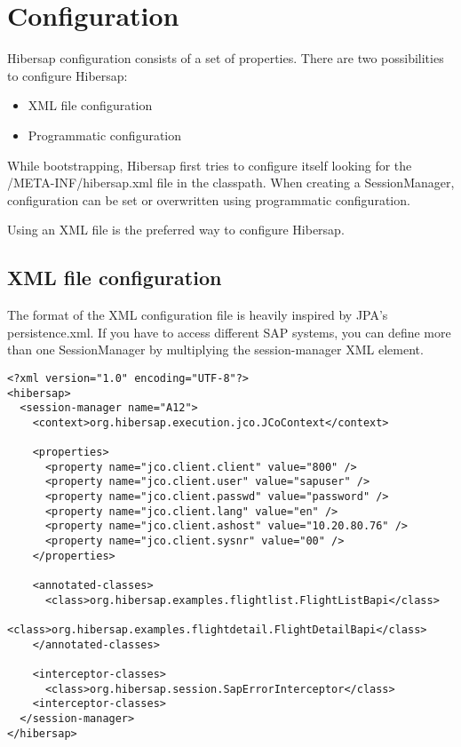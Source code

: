 
\chapter{Configuration}
\label{cha:Configuration}

Hibersap configuration consists of a set of properties. 
There are two possibilities to configure Hibersap: 
\begin{itemize}
  \item XML file configuration 
  \item Programmatic configuration
\end{itemize}

While bootstrapping, Hibersap first tries to configure itself looking for the /META-INF/hibersap.xml file in the
classpath. When creating a SessionManager, configuration can be set or overwritten using programmatic configuration.

Using an XML file is the preferred way to configure Hibersap.


\section{XML file configuration}
\label{sec:XML file configuration}

The format of the XML configuration file is heavily inspired by JPA's persistence.xml.
If you have to access different SAP systems, you can define more than one SessionManager by multiplying the
session-manager XML element.

\begin{Verbatim}[frame=single,label=hibersap.xml]
<?xml version="1.0" encoding="UTF-8"?>
<hibersap>
  <session-manager name="A12">
    <context>org.hibersap.execution.jco.JCoContext</context>

    <properties>
      <property name="jco.client.client" value="800" />
      <property name="jco.client.user" value="sapuser" />
      <property name="jco.client.passwd" value="password" />
      <property name="jco.client.lang" value="en" />
      <property name="jco.client.ashost" value="10.20.80.76" />
      <property name="jco.client.sysnr" value="00" />
    </properties>

    <annotated-classes>
      <class>org.hibersap.examples.flightlist.FlightListBapi</class>
      <class>org.hibersap.examples.flightdetail.FlightDetailBapi</class>
    </annotated-classes>
    
    <interceptor-classes>
      <class>org.hibersap.session.SapErrorInterceptor</class>
    <interceptor-classes>
  </session-manager>
</hibersap>
\end{Verbatim}

